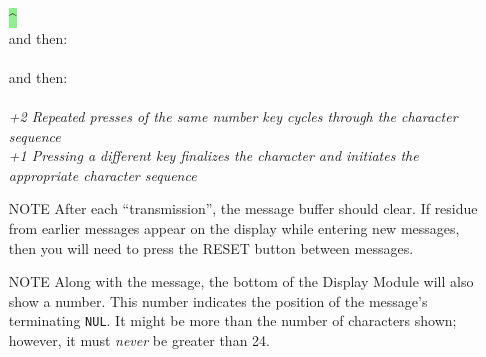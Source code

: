 \begin{enumerate}
{{            \colorbox{LightGreen}{\phantom{xxxx}\^{}\phantom{xxxxxxxxxxx}}
        } \\
        and then: \\
         \\
        and then: \\
         \\
        \textit{+2 Repeated presses of the same number key cycles through the character sequence} \\
        \textit{+1 Pressing a different key finalizes the character and initiates the appropriate character sequence}
    }
     \\

    \item[NOTE] After each ``transmission'', the message buffer should clear.
        If residue from earlier messages appear on the display while entering new messages, then you will need to press the RESET button between messages. \\

    \item[NOTE] Along with the message, the bottom of the Display Module will also show a number.
        This number indicates the position of the message's terminating \lstinline{NUL}.
        It might be more than the number of characters shown;
        however, it must \textit{never} be greater than 24. \\


\end{enumerate}

